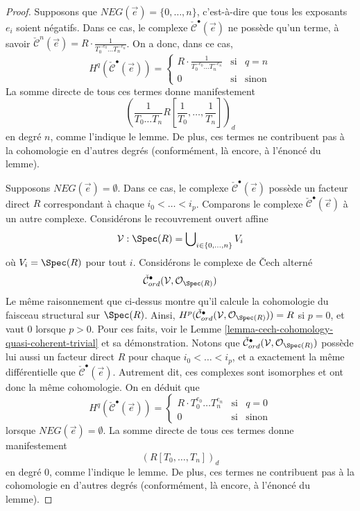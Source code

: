\begin{proof}
\medskip\noindent
Supposons que $NEG(\vec{e}) = \{0, \ldots, n\}$, c'est-à-dire que tous les
exposants $e_i$ soient négatifs.
Dans ce cas, le complexe $\check{\mathcal{C}}^\bullet(\vec{e})$ ne possède
qu'un terme, à savoir $\check{\mathcal{C}}^n(\vec{e}) =
R \cdot \frac{1}{T_0^{-e_0} \ldots T_n^{-e_n}}$. On a donc, dans ce
cas,
$$
H^q(\check{\mathcal{C}}^\bullet(\vec{e})) =
\left\{
\begin{matrix}
R \cdot \frac{1}{T_0^{-e_0} \ldots T_n^{-e_n}} & \text{si} & q = n \\
0 & \text{si} & \text{sinon}
\end{matrix}
\right.
$$
La somme directe de tous ces termes donne manifestement
$$
\left(\frac{1}{T_0 \ldots T_n} R[\frac{1}{T_0}, \ldots, \frac{1}{T_n}]\right)_d
$$
en degré $n$, comme l'indique le lemme. De plus, ces termes ne contribuent pas
à la cohomologie en d'autres degrés (conformément, là encore, à l'énoncé du
lemme).

\medskip\noindent
Supposons $NEG(\vec{e}) = \emptyset$. Dans ce cas, le complexe
$\check{\mathcal{C}}^\bullet(\vec{e})$ possède un facteur direct $R$ correspondant
à chaque $i_0 < \ldots < i_p$.
Comparons le complexe $\check{\mathcal{C}}^\bullet(\vec{e})$
à un autre complexe. Considérons le recouvrement ouvert affine
$$
\mathcal{V} : \Spec(R) = \bigcup\nolimits_{i \in \{0, \ldots, n\}} V_i
$$
où $V_i = \Spec(R)$ pour tout $i$. Considérons le complexe de
{\v C}ech alterné
$$
\check{\mathcal{C}}_{ord}^\bullet(\mathcal{V}, \mathcal{O}_{\Spec(R)})
$$
Le même raisonnement que ci-dessus montre qu'il calcule la cohomologie du
faisceau structural sur $\Spec(R)$. Ainsi,
$H^p(
\check{\mathcal{C}}_{ord}^\bullet(\mathcal{V}, \mathcal{O}_{\Spec(R)})
) = R$ si $p = 0$, et vaut $0$ lorsque $p > 0$.
Pour ces faits, voir le
Lemme \ref{lemma-cech-cohomology-quasi-coherent-trivial} et sa démonstration.
Notons que
$\check{\mathcal{C}}_{ord}^\bullet(\mathcal{V}, \mathcal{O}_{\Spec(R)})$
possède lui aussi un facteur direct $R$ pour chaque $i_0 < \ldots < i_p$, et a exactement la même
différentielle que $\check{\mathcal{C}}^\bullet(\vec{e})$. Autrement dit,
ces complexes sont isomorphes et ont donc la même cohomologie.
On en déduit que
$$
H^q(\check{\mathcal{C}}^\bullet(\vec{e})) =
\left\{
\begin{matrix}
R \cdot T_0^{e_0} \ldots T_n^{e_n} & \text{si} & q = 0 \\
0 & \text{si} & \text{sinon}
\end{matrix}
\right.
$$
lorsque $NEG(\vec{e}) = \emptyset$.
La somme directe de tous ces termes donne manifestement
$$
(R[T_0, \ldots, T_n])_d
$$
en degré $0$, comme l'indique le lemme. De plus, ces termes ne contribuent pas
à la cohomologie en d'autres degrés (conformément, là encore, à l'énoncé du
lemme).


\end{proof}
